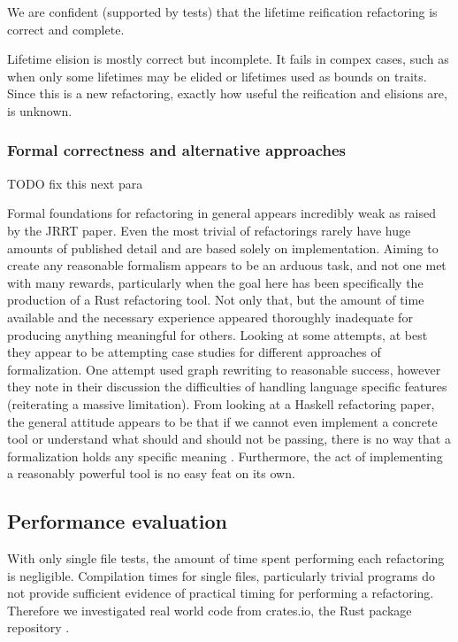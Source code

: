 We are confident (supported by tests) that the lifetime reification refactoring is correct and complete.

Lifetime elision is mostly correct but incomplete. It fails in compex cases, such as when only some lifetimes may be elided or lifetimes used as bounds on traits. Since this is a new refactoring, exactly how useful the reification and elisions are, is unknown.

\subsubsection{Formal correctness and alternative approaches}

TODO fix this next para

Formal foundations for refactoring in general appears incredibly weak as raised by the JRRT paper. Even the most trivial of refactorings rarely have huge amounts of published detail and are based solely on implementation. Aiming to create any reasonable formalism appears to be an arduous task, and not one met with many rewards, particularly when the goal here has been specifically the production of a Rust refactoring tool. Not only that, but the amount of time available and the necessary experience appeared thoroughly inadequate for producing anything meaningful for others. Looking at some attempts, at best they appear to be attempting case studies for different approaches of formalization. One attempt used graph rewriting \cite{graph} to reasonable success, however they note in their discussion the difficulties of handling language specific features (reiterating a massive limitation). From looking at a Haskell refactoring paper, the general attitude appears to be that if we cannot even implement a concrete tool or understand what should and should not be passing, there is no way that a formalization holds any specific meaning \cite{sculthorpe}. Furthermore, the act of implementing a reasonably powerful tool is no easy feat on its own. 


\subsection{Performance evaluation}\label{S:perfeval}
With only single file tests, the amount of time spent performing each refactoring is negligible. Compilation times for single files, particularly trivial programs do not provide sufficient evidence of practical timing for performing a refactoring. Therefore we investigated real world code from  crates.io, the Rust package repository \cite{cratesio15}. 

